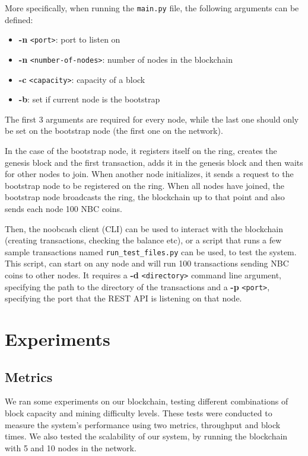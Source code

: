 \documentclass[conference]{IEEEtran}
\begin{document}
More specifically, when running the \verb|main.py| file, the following arguments can be defined:

\begin{itemize}
\item \textbf{-n} \verb|<port>|: port to listen on
\item \textbf{-n} \verb|<number-of-nodes>|: number of nodes in the blockchain
\item \textbf{-c} \verb|<capacity>|: capacity of a block
\item \textbf{-b}: set if current node is the bootstrap
\end{itemize}

The first 3 arguments are required for every node, while the last one should only be set on the bootstrap node (the first one on the network).

In the case of the bootstrap node, it registers itself on the ring, creates the genesis block and the first transaction, adds it in the genesis block and then waits for other nodes to join. When another node initializes, it sends a request to the bootstrap node to be registered on the ring. When all nodes have joined, the bootstrap node broadcasts the ring, the blockchain up to that point and also sends each node 100 NBC coins.

Then, the noobcash client (CLI) can be used to interact with the blockchain (creating transactions, checking the balance etc), or a script that runs a few sample transactions named \verb|run_test_files.py| can be used, to test the system. This script, can start on any node and will run 100 transactions sending NBC coins to other nodes. It requires a \textbf{-d} \verb|<directory>| command line argument, specifying the path to the directory of the transactions and a  
\textbf{-p} \verb|<port>|, specifying the port that the REST API is listening on that node.

\section{\textbf{Experiments}}
\subsection{Metrics}
We ran some experiments on our blockchain, testing different combinations of block capacity and mining difficulty levels. These tests were conducted to measure the system's performance using two metrics, throughput and block times. We also tested the scalability of our system, by running the blockchain with 5 and 10 nodes in the network.
\end{document}
